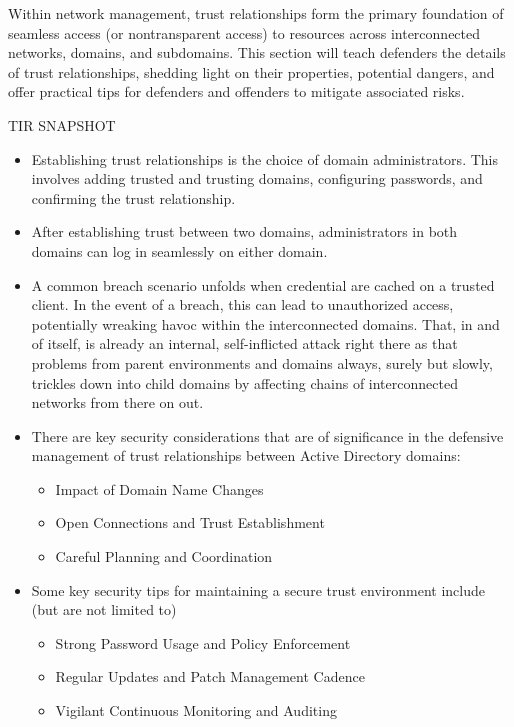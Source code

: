 Within network management, trust relationships form the primary foundation of seamless access (or nontransparent access) to resources across interconnected networks, domains, and subdomains. This section will teach defenders the details of trust relationships, shedding light on their properties, potential dangers, and offer practical tips for defenders and offenders to mitigate associated risks.
\begin{tcolorbox}
    TIR SNAPSHOT \begin{itemize}
        \item Establishing trust relationships is the choice of domain administrators. This involves adding trusted and trusting domains, configuring passwords, and confirming the trust relationship.
        \item After establishing trust between two domains, administrators in both domains can log in seamlessly on either domain.
        \item A common breach scenario unfolds when credential are cached on a trusted client. In the event of a breach, this can lead to unauthorized access, potentially wreaking havoc within the interconnected domains. That, in and of itself, is already an internal, self-inflicted attack right there as that problems from parent environments and domains always, surely but slowly, trickles down into child domains by affecting chains of interconnected networks from there on out.
        \item  There are key security considerations that are of significance in the defensive management of trust relationships between Active Directory domains: \begin{itemize}
            \item Impact of Domain Name Changes
            \item Open Connections and Trust Establishment
            \item Careful Planning and Coordination
        \end{itemize}
    \item Some key security tips for maintaining a secure trust environment include (but are not limited to)
    \begin{itemize}
        \item Strong Password Usage and Policy Enforcement
        \item Regular Updates and Patch Management Cadence
        \item Vigilant Continuous Monitoring and Auditing
    \end{itemize}
    \end{itemize}
\end{tcolorbox}

